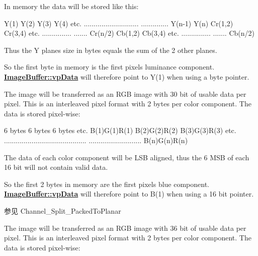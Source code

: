 \begin{Desc}
\begin{description}
In memory the data will be stored like this\+:


\begin{DoxyCode}
Y(1)    Y(2)    Y(3)    Y(4) etc.
............................
..............  Y(n-1)  Y(n)
Cr(1,2) Cr(3,4) etc.
...............
....... Cr(n/2)
Cb(1,2) Cb(3,4) etc.
...............
....... Cb(n/2)
\end{DoxyCode}


Thus the Y planes size in bytes equals the sum of the 2 other planes.

So the first byte in memory is the first pixels luminance component. {\bfseries \hyperlink{struct_image_buffer_ab67c9c21d749e786302c848b508e0673}{Image\+Buffer\+::vp\+Data}} will therefore point to Y(1) when using a byte pointer. \item[{\em 
\hypertarget{group___common_interface_gga456e8aa76e06bb761f27c52141475985a21c4f440a6feef78712a77337c2d1416}{ibpf\+R\+G\+B101010\+Packed}\label{group___common_interface_gga456e8aa76e06bb761f27c52141475985a21c4f440a6feef78712a77337c2d1416}
}]The image will be transferred as an R\+G\+B image with 30 bit of usable data per pixel. This is an interleaved pixel format with 2 bytes per color component. The data is stored pixel-\/wise\+:


\begin{DoxyCode}
6 bytes        6 bytes        6 bytes      etc.
B(1)G(1)R(1)   B(2)G(2)R(2)   B(3)G(3)R(3) etc.
..........................................
...........................   B(n)G(n)R(n)
\end{DoxyCode}


The data of each color component will be L\+S\+B aligned, thus the 6 M\+S\+B of each 16 bit will not contain valid data.

So the first 2 bytes in memory are the first pixels blue component. {\bfseries \hyperlink{struct_image_buffer_ab67c9c21d749e786302c848b508e0673}{Image\+Buffer\+::vp\+Data}} will therefore point to B(1) when using a 16 bit pointer.

\begin{DoxySeeAlso}{参见}
Channel\+\_\+\+Split\+\_\+\+Packed\+To\+Planar 
\end{DoxySeeAlso}
\item[{\em 
\hypertarget{group___common_interface_gga456e8aa76e06bb761f27c52141475985ad985d385992cc2fd9044dbc63fe127d6}{ibpf\+R\+G\+B121212\+Packed}\label{group___common_interface_gga456e8aa76e06bb761f27c52141475985ad985d385992cc2fd9044dbc63fe127d6}
}]The image will be transferred as an R\+G\+B image with 36 bit of usable data per pixel. This is an interleaved pixel format with 2 bytes per color component. The data is stored pixel-\/wise\+:



\end{description}
\end{Desc}
